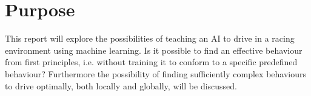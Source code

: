 




\section{Purpose}
This report will explore the possibilities of teaching an AI to drive in a racing environment using machine learning. Is it possible to find an effective behaviour from first principles, i.e. without training it to conform to a specific predefined behaviour? Furthermore the possibility of finding sufficiently complex behaviours to drive optimally, both locally and globally, will be discussed. 

